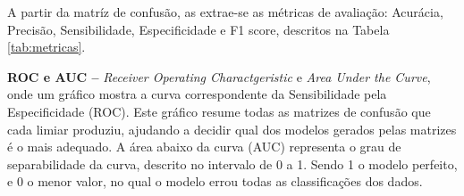 A partir da matríz de confusão, as extrae-se as métricas de avaliação: Acurácia, Precisão, Sensibilidade, Especificidade e F1 score, descritos na Tabela \ref{tab:metricas}.

\textbf{ROC e AUC --} \textit{Receiver Operating Charactgeristic} e \textit{Area Under the Curve}, onde um gráfico mostra a curva correspondente da Sensibilidade pela Especificidade (ROC). Este gráfico resume todas as matrizes de confusão que cada limiar produziu, ajudando a decidir qual dos modelos gerados pelas matrizes é o mais adequado. A área abaixo da curva (AUC) representa o grau de separabilidade da curva, descrito no intervalo de 0 a 1. Sendo 1 o modelo perfeito, e 0 o menor valor, no qual o modelo errou todas as classificações dos dados.

